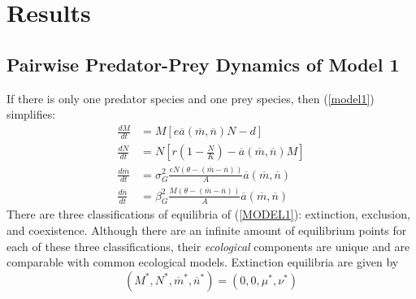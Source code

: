 \documentclass{amsart}
\theoremstyle{definition}
\theoremstyle{remark}
\numberwithin{equation}{section}
\begin{document}
\pagebreak
\section{Results}
\subsection{Pairwise Predator-Prey Dynamics of Model 1}
If there is only one predator species and one prey species, then (\ref{model1}) simplifies:
\begin{subequations}
	\label{MODEL1}
	\begin{align}
		\label{eq:MODEL1_A}
		\frac{dM}{dt} &= M\left[e\overline{a}(\overline{m}, \overline{n})N - d\right] \\[5px]
		\label{eq:MODEL1_B}
		\frac{dN}{dt} &= N\left[r\left(1 - \frac{N}{K}\right) - \overline{a}(\overline{m}, \overline{n})M\right] \\[5px]
		\label{eq:MODEL1_C}
		\frac{d\overline{m}}{dt} &= \sigma_{G}^2\frac{eN(\theta - (\overline{m} - \overline{n}))}{A}\overline{a}(\overline{m}, \overline{n}) \\[5px]
		\label{eq:MODEL1_D}
		\frac{d\overline{n}}{dt} &= \beta_{G}^2\frac{M(\theta - (\overline{m} - \overline{n}))}{A}\overline{a}(\overline{m}, \overline{n})
	\end{align}
\end{subequations}
There are three classifications of equilibria of (\ref{MODEL1}): extinction, exclusion, and coexistence.  Although there are an infinite amount of equilibrium points for each of these three classifications, their {\it ecological} components are unique and are comparable with common ecological models.  Extinction equilibria are given by
\begin{equation}
	\label{extinction_MODEL1}
	(M^*, N^*, \overline{m}^*, \overline{n}^*) = (0, 0, \mu^*, \nu^*)
\end{equation}
\end{document}
